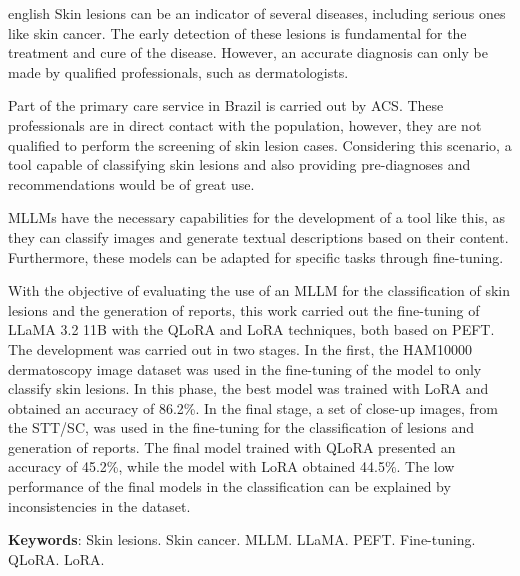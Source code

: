 \begin{resumo}[Abstract]
    \SingleSpacing
    \begin{otherlanguage*}{english}
        Skin lesions can be an indicator of several diseases, including serious ones like skin cancer. The early
        detection of these lesions is fundamental for the treatment and cure of the disease. However, an accurate
        diagnosis can only be made by qualified professionals, such as dermatologists.

        Part of the primary care service in Brazil is carried out by \acf{ACS}. These professionals are in direct
        contact with the population, however, they are not qualified to perform the screening of skin lesion cases.
        Considering this scenario, a tool capable of classifying skin lesions and also providing pre-diagnoses and
        recommendations would be of great use.

        \acfp{MLLM} have the necessary capabilities for the development of a tool like this, as they can classify
        images and generate textual descriptions based on their content. Furthermore, these models can be adapted for
        specific tasks through fine-tuning.

        With the objective of evaluating the use of an \ac{MLLM} for the classification of skin lesions and the
        generation of reports, this work carried out the fine-tuning of \acf{LLaMA} 3.2 11B with the \acf{QLoRA} and
        \acf{LoRA} techniques, both based on \acf{PEFT}. The development was carried out in two stages. In the first,
        the \acf{HAM10000} dermatoscopy image dataset was used in the fine-tuning of the model to only classify skin
        lesions. In this phase, the best model was trained with \ac{LoRA} and obtained an accuracy of 86.2\%. In the
        final stage, a set of close-up images, from the \acf{STT/SC}, was used in the fine-tuning for the
        classification of lesions and generation of reports. The final model trained with QLoRA presented an accuracy
        of 45.2\%, while the model with \ac{LoRA} obtained 44.5\%. The low performance of the final models in the
        classification can be explained by inconsistencies in the dataset.

        \textbf{Keywords}: Skin lesions. Skin cancer. MLLM. LLaMA. PEFT. Fine-tuning. QLoRA. LoRA.
    \end{otherlanguage*}
\end{resumo}

{
\hypersetup{hidelinks}

\listoffigures

\imprimirlistadesiglas

\tableofcontents*
\cleardoublepage
}
